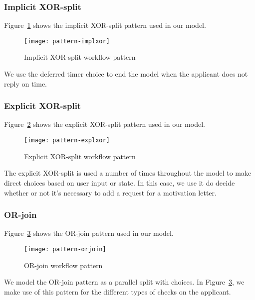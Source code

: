 \subsubsection{Implicit XOR-split}

	Figure~\ref{fig:patterns:implxor} shows the implicit XOR-split pattern used in our model.

	\begin{figure}[H]
		\centering
		\texttt{[image: pattern-implxor]}
		\caption{Implicit XOR-split workflow pattern}
		\label{fig:patterns:implxor}
	\end{figure}

	We use the deferred timer choice to end the model when the applicant does not reply on time.

\subsubsection{Explicit XOR-split}

	Figure~\ref{fig:patterns:explxor} shows the explicit XOR-split pattern used in our model.

	\begin{figure}[H]
		\centering
		\texttt{[image: pattern-explxor]}
		\caption{Explicit XOR-split workflow pattern}
		\label{fig:patterns:explxor}
	\end{figure}

	The explicit XOR-split is used a number of times throughout the model to make direct choices based on user input or state.
	In this case, we use it do decide whether or not it's necessary to add a request for a motivation letter.

\subsubsection{OR-join}

	Figure~\ref{fig:patterns:orjoin} shows the OR-join pattern used in our model.

	\begin{figure}[H]
		\centering
		\texttt{[image: pattern-orjoin]}
		\caption{OR-join workflow pattern}
		\label{fig:patterns:orjoin}
	\end{figure}

	We model the OR-join pattern as a parallel split with choices.
	In Figure~\ref{fig:patterns:orjoin}, we make use of this pattern for the different types of checks on the applicant.

